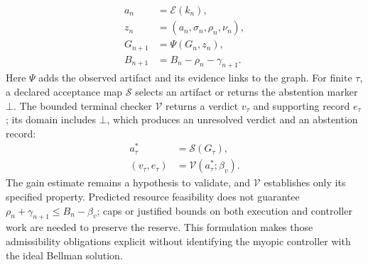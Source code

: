 \begin{equation}
\begin{aligned}
 a_n&=\mathcal E(k_n),\\
 z_n&=(a_n,\sigma_n,\rho_n,\nu_n),\\
 G_{n+1}&=\Psi(G_n,z_n),\\
 B_{n+1}&=B_n-\rho_n-\gamma_{n+1}.
\end{aligned}
\label{eq:C09:computation-transition}
\end{equation}
Here $\Psi$ adds the observed artifact and its evidence links to the graph. For finite $\tau$, a declared acceptance map $\mathcal S$ selects an artifact or returns the abstention marker $\bot$. The bounded terminal checker $\mathcal V$ returns a verdict $v_\tau$ and supporting record $e_\tau$; its domain includes $\bot$, which produces an unresolved verdict and an abstention record:
\begin{equation}
\begin{aligned}
 a_\tau^*&=\mathcal S(G_\tau),\\
 (v_\tau,e_\tau)&=\mathcal V(a_\tau^*;\beta_v).
\end{aligned}
\label{eq:C09:terminal-verification}
\end{equation}
The gain estimate remains a hypothesis to validate, and $\mathcal V$ establishes only its specified property. Predicted resource feasibility does not guarantee $\rho_n+\gamma_{n+1}\leq B_n-\beta_v$; caps or justified bounds on both execution and controller work are needed to preserve the reserve. This formulation makes those admissibility obligations explicit without identifying the myopic controller with the ideal Bellman solution.

